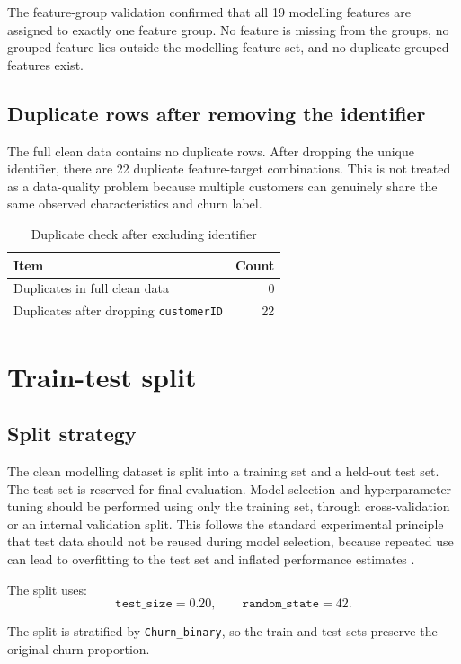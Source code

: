 The feature-group validation confirmed that all 19 modelling features are assigned to exactly one feature group. No feature is missing from the groups, no grouped feature lies outside the modelling feature set, and no duplicate grouped features exist.

\subsection{Duplicate rows after removing the identifier}

The full clean data contains no duplicate rows. After dropping the unique identifier, there are 22 duplicate feature-target combinations. This is not treated as a data-quality problem because multiple customers can genuinely share the same observed characteristics and churn label.

\begin{table}[H]
\centering
\caption{Duplicate check after excluding identifier}
\begin{tabular}{lr}
\toprule
Item & Count \\
\midrule
Duplicates in full clean data & 0 \\
Duplicates after dropping \texttt{customerID} & 22 \\
\bottomrule
\end{tabular}
\end{table}

\section{Train-test split}

\subsection{Split strategy}

The clean modelling dataset is split into a training set and a held-out test set. The test set is reserved for final evaluation. Model selection and hyperparameter tuning should be performed using only the training set, through cross-validation or an internal validation split. This follows the standard experimental principle that test data should not be reused during model selection, because repeated use can lead to overfitting to the test set and inflated performance estimates \cite{ml-evaluation}.

The split uses:
\[
\texttt{test\_size} = 0.20,
\qquad
\texttt{random\_state} = 42.
\]

The split is stratified by \texttt{Churn\_binary}, so the train and test sets preserve the original churn proportion.

